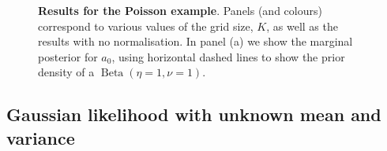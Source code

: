 \documentclass[a4paper, notitlepage, 11pt]{article}
\begin{document}
\begin{figure}[!ht]
\hfill
{}
\hfill
{}
\hfill
{}
\hfill
\caption{\textbf{Results for the Poisson example}.
Panels (and colours) correspond to various values of the grid size, $K$, as well as the results with no normalisation.
In panel (a) we show the marginal posterior for $a_0$, using horizontal dashed lines to show the prior density of a $\operatorname{Beta}(\eta = 1, \nu = 1)$.
}
\label{fig:poisson}
\end{figure}

\subsection{Gaussian likelihood with unknown mean and variance}
\label{sec:gaussian_illus}
\end{document}
